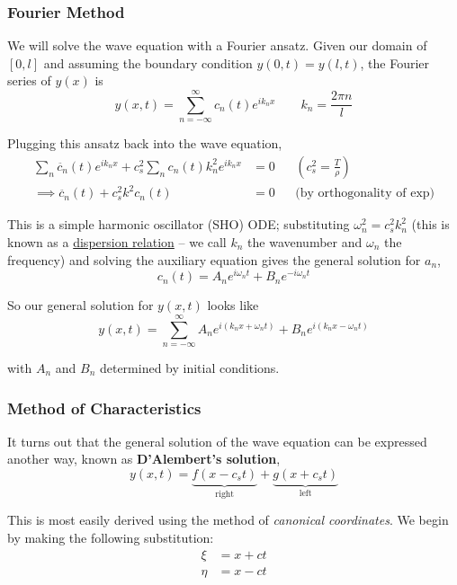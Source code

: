 \documentclass[12pt]{article}
\begin{document}
\subsubsection{Fourier Method}
We will solve the wave equation with a Fourier ansatz. Given our domain of $[0, l]$ and assuming the boundary condition $y(0, t) = y(l, t)$, the Fourier series of $y(x)$ is
\begin{equation}
	y(x, t) = \sum_{n = -\infty}^{\infty}c_n(t) e^{ik_n x} \quad \quad {k_n = \frac{2\pi n}{l}}
\end{equation}

Plugging this ansatz back into the wave equation,
\begin{align*}
	\sum_{n}\ddot{c_n}(t)e^{ik_nx} + c_s^2\sum_{n}c_n(t)k_n^2e^{ik_n x} &= 0 && (c_s^2 = \frac{T}{\rho})\\
	\implies \ddot{c_n}(t) + c_s^2k^2c_n(t) &= 0 && \text{(by orthogonality of exp)}
\end{align*}

This is a simple harmonic oscillator (SHO) ODE; substituting $\omega_n^2 = c_s^2 k_n^2$ (this is known as a \hyperref[sec:dispersionrel]{dispersion relation} -- we call $k_n$ the wavenumber and $\omega_n$ the frequency) and solving the auxiliary equation gives the general solution for $a_n$,
\begin{equation}
	c_n(t) = A_ne^{i\omega_n t} + B_n e^{-i\omega_n t}
\end{equation}

So our general solution for $y(x, t)$ looks like
\begin{equation}
	y(x, t) = \sum_{n=-\infty}^{\infty} A_n e^{i(k_n x + \omega_n t)} + B_n e^{i(k_n x - \omega_n t)}
\end{equation}

with $A_n$ and $B_n$ determined by initial conditions.

\subsubsection{Method of Characteristics}

It turns out that the general solution of the wave equation can be expressed another way, known as \textbf{D'Alembert's solution},
\begin{equation*}
y(x, t) = \underbrace{f(x - c_s t)}_{\text{right}} + \underbrace{g(x + c_s t)}_{\text{left}}
\end{equation*}

This is most easily derived using the method of \textit{canonical coordinates}. We begin by making the following substitution:
\begin{align*}
	\xi &= x + ct\\
	\eta &= x - ct
\end{align*}
\end{document}
